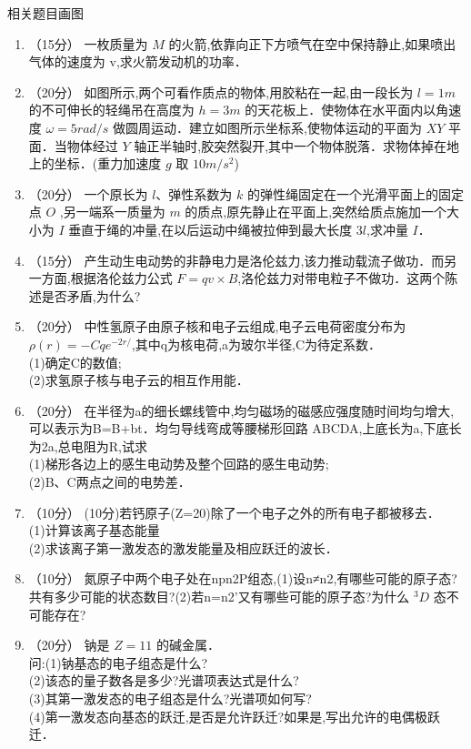 
\begin{issues}
\issueTODO
相关题目画图
\end{issues}


\begin{enumerate}
\item （15分）
一枚质量为 $M$ 的火箭,依靠向正下方喷气在空中保持静止,如果喷出气体的速度为 $\mathrm v$,求火箭发动机的功率．
\item （20分）
如图所示,两个可看作质点的物体,用胶粘在一起,由一段长为 $l=1m$ 的不可伸长的轻绳吊在高度为 $h=3m$ 的天花板上．使物体在水平面内以角速度 $\omega=5rad/s$ 做圆周运动．建立如图所示坐标系,使物体运动的平面为 $XY$ 平面．当物体经过 $Y$ 轴正半轴时,胶突然裂开,其中一个物体脱落．求物体掉在地上的坐标．(重力加速度 $g$ 取 $10m/s^2$)
\item （20分）
一个原长为 $l$、弹性系数为 $k$ 的弹性绳固定在一个光滑平面上的固定点 $O$ ,另一端系一质量为 $m$ 的质点,原先静止在平面上,突然给质点施加一个大小为 $I$ 垂直于绳的冲量,在以后运动中绳被拉伸到最大长度 $3l$,求冲量 $I$．
\item （15分）
产生动生电动势的非静电力是洛伦兹力,该力推动载流子做功．而另一方面,根据洛伦兹力公式 $F=qv\times B$,洛伦兹力对带电粒子不做功．这两个陈述是否矛盾,为什么?
\item （20分）
中性氢原子由原子核和电子云组成,电子云电荷密度分布为 $\rho(r)=-Cqe^{-2r/}$,其中q为核电荷,a为玻尔半径,C为待定系数．\\
(1)确定C的数值;\\
(2)求氢原子核与电子云的相互作用能．
\item （20分）
在半径为a的细长螺线管中,均匀磁场的磁感应强度随时间均匀增大,可以表示为B=B+bt．均匀导线弯成等腰梯形回路 ABCDA,上底长为a,下底长为2a,总电阻为R,试求\\
(1)梯形各边上的感生电动势及整个回路的感生电动势;\\
(2)B、C两点之间的电势差．
\item （10分）
(10分)若钙原子(Z=20)除了一个电子之外的所有电子都被移去．\\
(1)计算该离子基态能量\\
(2)求该离子第一激发态的激发能量及相应跃迁的波长．
\item （10分）
氮原子中两个电子处在npn2P组态,(1)设n≠n2,有哪些可能的原子态?共有多少可能的状态数目?(2)若n=n2’又有哪些可能的原子态?为什么 $^{3}D$ 态不可能存在?
\item （20分） 
钠是 $Z=11$ 的碱金属．\\问:(1)钠基态的电子组态是什么?\\(2)该态的量子数各是多少?光谱项表达式是什么?\\(3)其第一激发态的电子组态是什么?光谱项如何写?\\(4)第一激发态向基态的跃迁,是否是允许跃迁?如果是,写出允许的电偶极跃迁．
\end{enumerate}